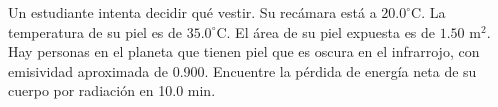 \item Un estudiante intenta decidir qué vestir. Su recámara está a $20.0^\circ\text{C}$. La temperatura de su piel es de $35.0^\circ\text{C}$. El área de su piel expuesta es de $1.50\text{ m}^2$. Hay personas en el planeta que tienen piel que es oscura en el infrarrojo, con emisividad aproximada de 0.900. Encuentre la pérdida de energía neta de su cuerpo por radiación en 10.0 min.
